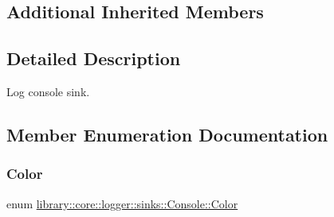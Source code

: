 \subsection*{Additional Inherited Members}


\subsection{Detailed Description}
Log console sink. 

\subsection{Member Enumeration Documentation}
\mbox{\label{classlibrary_1_1core_1_1logger_1_1sinks_1_1_console_aa7a07d8165e1df74ad4d289d5220bc96}} 
\subsubsection{\texorpdfstring{Color}{Color}}
{\footnotesize\ttfamily enum \mbox{\hyperlink{classlibrary_1_1core_1_1logger_1_1sinks_1_1_console_aa7a07d8165e1df74ad4d289d5220bc96}{library\+::core\+::logger\+::sinks\+::\+Console\+::\+Color}}\hspace{0.3cm}{\ttfamily [strong]}}


